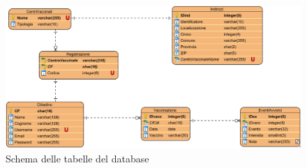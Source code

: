 \begin{figure}[h]
	\includegraphics[width=\textwidth]{./img/CentriVaccinaliDB}
	\caption{Schema delle tabelle del database}
	\label{fig:schemaTabelle}
\end{figure}